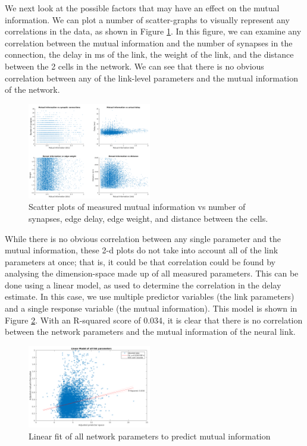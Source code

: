 \documentclass[letterpaper, 10 pt, conference]{ieeeconf}  %
\begin{document}
We next look at the possible factors that may have an effect on the mutual information. We can plot a number of scatter-graphs to visually represent any correlations in the data, as shown in Figure \ref{fig:mInfoCorrGraph}. In this figure, we can examine any correlation between the mutual information and the number of synapses in the connection, the delay in ms of the link, the weight of the link, and the distance between the 2 cells in the network. We can see that there is no obvious correlation between any of the link-level parameters and the mutual information of the network.\\
\begin{figure}[ht]
    \includegraphics[width=0.48\textwidth]{minfoCorrPlot.png}
    \caption{Scatter plots of measured mutual information vs number of synapses, edge delay, edge weight, and distance between the cells.}
    \label{fig:mInfoCorrGraph}
\end{figure}
While there is no obvious correlation between any single parameter and the mutual information, these 2-d plots do not take into account all of the link parameters at once; that is, it could be that correlation could be found by analysing the dimension-space made up of all measured parameters. This can be done using a linear model, as used to determine the correlation in the delay estimate. In this case, we use multiple predictor variables (the link parameters) and a single response variable (the mutual information). This model is shown in Figure \ref{fig:lmInfo}. With an R-squared score of 0.034, it is clear that there is no correlation between the network parameters and the mutual information of the neural link.
\begin{figure}[ht]
    \centering
    \includegraphics[width=0.48\textwidth]{lmMinfo.png}
    \caption{Linear fit of all network parameters to predict mutual information}
    \label{fig:lmInfo}
\end{figure}
\end{document}
